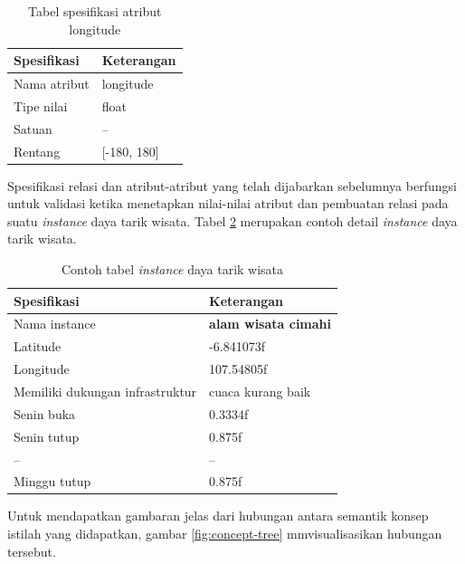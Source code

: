 \begin{table}[h]
\begin{center}
\begin{tabular}{ |l|m{8cm}| } 
\hline
	\textbf{Spesifikasi} & \textbf{Keterangan}\\
	\hline
	Nama atribut & longitude \\
	\hline
	Tipe nilai & float\\
	\hline
	Satuan & --\\
	\hline
	Rentang & [-180, 180]\\
	\hline
\end{tabular}
\end{center}
\caption{Tabel spesifikasi atribut longitude}
\label{table:longitude}
\end{table}

Spesifikasi relasi dan atribut-atribut yang telah dijabarkan  sebelumnya berfungsi untuk validasi ketika menetapkan nilai-nilai atribut
dan pembuatan relasi pada suatu \textit{instance} daya tarik wisata. Tabel \ref{table:instance} merupakan contoh detail \textit{instance}
daya tarik wisata.
\begin{table}[h]
\begin{center}
\begin{tabular}{ |l|m{8cm}| } 
\hline
	\textbf{Spesifikasi} & \textbf{Keterangan}\\
	\hline
	Nama instance & \textbf{alam wisata cimahi} \\
	\hline
	Latitude & -6.841073f\\
	\hline
	Longitude & 107.54805f\\
	\hline
	Memiliki dukungan infrastruktur & cuaca kurang baik\\
	\hline
	Senin buka & 0.3334f\\
	\hline
	Senin tutup & 0.875f\\
	\hline
	-- & -- \\
	\hline
	Minggu tutup & 0.875f\\
	\hline
\end{tabular}
\end{center}
\caption{Contoh tabel \textit{instance} daya tarik wisata}
\label{table:instance}
\end{table}

\par 
Untuk mendapatkan gambaran jelas dari hubungan antara semantik konsep istilah yang didapatkan, gambar \ref{fig:concept-tree} mmvisualisasikan hubungan tersebut.

